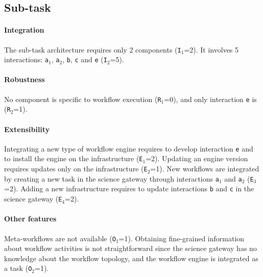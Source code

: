 \documentclass[preprint,3p,twocolumn]{elsarticle}
\newcommand{\todo}[1]{\color{blue}\xspace[\emph{#1}]\xspace\color{black}}
\begin{document}
\subsection{Sub-task}

\paragraph{Integration} The sub-task architecture requires only 2
components (\texttt{I$_1$}=2).  It involves 5 interactions:
\texttt{a$_1$}, \texttt{a$_2$}, \texttt{b}, \texttt{c} and
\texttt{e} (\texttt{I$_2$}=5).

\paragraph{Robustness} No component is specific to workflow execution
(\texttt{R$_1$}=0), and only interaction \texttt{e} is
(\texttt{R$_2$}=1).

\paragraph{Extensibility} Integrating a new type of workflow engine
requires to develop interaction \texttt{e} and to install the engine
on the infrastructure (\texttt{E$_1$}=2). Updating an engine version
requires updates only on the infrastructure (\texttt{E$_2$}=1).  New
workflows are integrated by creating a new task in the science gateway
through interactions \texttt{a$_1$} and \texttt{a$_2$}  (\texttt{E$_3$}=2). Adding a new
infrastructure requires to update interactions \texttt{b} and
\texttt{c} in the science gateway (\texttt{E$_4$}=2).

\paragraph{Other features} Meta-workflows are not available
(\texttt{O$_1$}=1).  Obtaining fine-grained information about workflow
activities is not straightforward since the science gateway has no
knowledge about the workflow topology, and the workflow engine is
integrated as a task (\texttt{O$_2$}=1).

\end{document}
